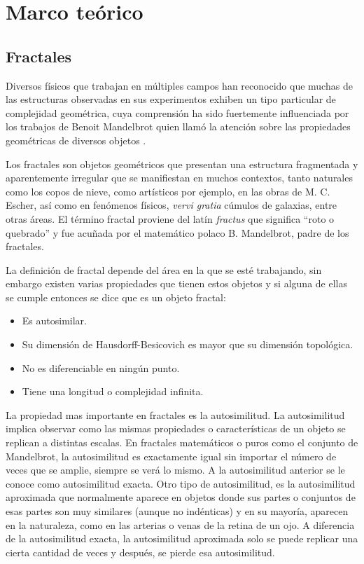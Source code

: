 \chapter{Marco te\'{o}rico}

\section{Fractales}

Diversos físicos que trabajan en múltiples campos han reconocido que muchas de las estructuras observadas en sus experimentos exhiben un tipo particular de complejidad geométrica, cuya comprensión ha sido fuertemente influenciada por los trabajos de Benoit Mandelbrot quien llamó la atención sobre las propiedades geométricas de diversos objetos \cite{Vicsek1992}.

Los fractales son objetos geométricos que presentan una estructura fragmentada y aparentemente irregular que se manifiestan en muchos contextos, tanto naturales como los copos de nieve, como artísticos por ejemplo, en las obras de M. C. Escher, así como en fenómenos físicos, \textit{vervi gratia} cúmulos de galaxias, entre otras áreas. El término fractal  proviene del latín \textit{fractus} que significa ``roto o quebrado'' y fue acuñada por el matem\'{a}tico polaco B. Mandelbrot, padre de los fractales.

La definición de fractal depende del área en la que se esté trabajando, sin embargo existen varias propiedades que tienen estos objetos y si alguna de ellas se cumple entonces se dice que es un objeto fractal:

\begin{itemize}
	\item Es autosimilar.
	\item Su dimensión de Hausdorff-Besicovich es mayor que su dimensión topológica.
	\item No es diferenciable en ningún punto.
	\item Tiene una longitud o complejidad infinita.
\end{itemize}

La  propiedad mas importante en fractales es la autosimilitud. La autosimilitud implica observar como las mismas propiedades o caracter\'{i}sticas de un objeto se replican a distintas escalas. En fractales matem\'{a}ticos o puros como el conjunto de Mandelbrot, la autosimilitud es exactamente igual sin importar el n\'{u}mero de veces que se amplie, siempre se ver\'{a} lo mismo. A la autosimilitud anterior se le conoce como autosimilitud exacta. Otro tipo de autosimilitud, es la autosimilitud aproximada que normalmente aparece en objetos donde sus partes o conjuntos de esas partes son muy similares (aunque no ind\'{e}nticas) y en su mayor\'{i}a, aparecen en la naturaleza, como en las arterias o venas de la retina de un ojo. A diferencia de la autosimilitud exacta, la autosimilitud aproximada solo se puede replicar una cierta cantidad de veces y despu\'{e}s, se pierde esa autosimilitud.


